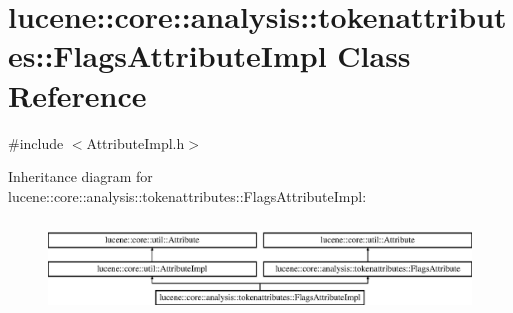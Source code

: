 \hypertarget{classlucene_1_1core_1_1analysis_1_1tokenattributes_1_1FlagsAttributeImpl}{}\section{lucene\+:\+:core\+:\+:analysis\+:\+:tokenattributes\+:\+:Flags\+Attribute\+Impl Class Reference}
\label{classlucene_1_1core_1_1analysis_1_1tokenattributes_1_1FlagsAttributeImpl}


{\ttfamily \#include $<$Attribute\+Impl.\+h$>$}

Inheritance diagram for lucene\+:\+:core\+:\+:analysis\+:\+:tokenattributes\+:\+:Flags\+Attribute\+Impl\+:\begin{figure}[H]
\begin{center}
\leavevmode
\includegraphics[height=2.507463cm]{classlucene_1_1core_1_1analysis_1_1tokenattributes_1_1FlagsAttributeImpl}
\end{center}
\end{figure}
